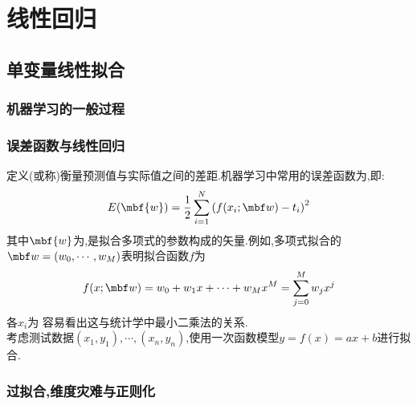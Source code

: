 \documentclass{ctexart}
\begin{document}
\section{线性回归}
\subsection{单变量线性拟合}
\subsubsection{机器学习的一般过程}
\subsubsection{误差函数与线性回归}
定义(或称)衡量预测值与实际值之间的差距.机器学习中常用的误差函数为,即:
\[E(\mbf{w})=\dfrac12\sum_{i=1}^{N}\left(f(x_i;\mbf w)-t_i\right)^2\]
其中$\mbf{w}$为,是拟合多项式的参数构成的矢量.例如,多项式拟合的$\mbf w=\left(w_0,\cdots,w_M\right)$表明拟合函数$f$为
\[f(x;\mbf w)=w_0+w_1x+\cdots+w_Mx^M=\sum_{j=0}^{M}w_jx^j\]
各$x_i$为
容易看出这与统计学中最小二乘法的关系.\\
考虑测试数据$(x_1,y_1),\cdots,(x_n,y_n)$,使用一次函数模型$y=f(x)=ax+b$进行拟合.
\subsubsection{过拟合,维度灾难与正则化}
\end{document}
